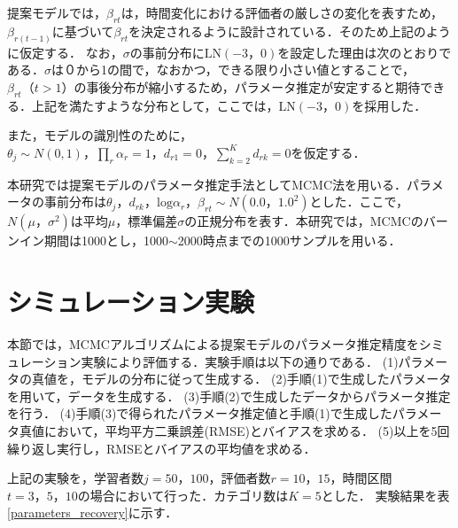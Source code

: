 \documentclass[dvipdfmx, twocolumn, a4paper]{hcresume}
\begin{document}
提案モデルでは，$\beta_{rt}$は，時間変化における評価者の厳しさの変化を表すため，$\beta_{r(t-1)}$に基づいて$\beta_{rt}$を決定されるように設計されている．そのため上記のように仮定する．
なお，$\sigma$の事前分布に$\mathrm{LN}(-3，0)$を設定した理由は次のとおりである．$\sigma$は０から1の間で，なおかつ，できる限り小さい値とすることで，$\beta_{rt}（t>1）$の事後分布が縮小するため，パラメータ推定が安定すると期待できる．上記を満たすような分布として，ここでは，$\mathrm{LN}(-3，0)$を採用した．

また，モデルの識別性のために，$\theta_{j}\sim N(0,1)，\prod_{r}\alpha_r=1，d_{r1}=0，\sum_{k=2}^{K}d_{rk}=0$を仮定する．

本研究では提案モデルのパラメータ推定手法としてMCMC法を用いる．パラメータの事前分布は$\theta_{j}，d_{rk}，\mathrm{log}\alpha_{r}，\beta_{rt}\sim N(0.0，1.0^{2})$とした．ここで，$N(\mu，\sigma^2)$は平均$\mu$，標準偏差$\sigma$の正規分布を表す．本研究では，MCMCのバーンイン期間は1000とし，1000$\sim$2000時点までの1000サンプルを用いる．
\section{シミュレーション実験}

本節では，MCMCアルゴリズムによる提案モデルのパラメータ推定精度をシミュレーション実験により評価する．実験手順は以下の通りである．
(1)パラメータの真値を，モデルの分布に従って生成する．
(2)手順(1)で生成したパラメータを用いて，データを生成する．
(3)手順(2)で生成したデータからパラメータ推定を行う．
(4)手順(3)で得られたパラメータ推定値と手順(1)で生成したパラメータ真値において，平均平方二乗誤差(RMSE)とバイアスを求める．
(5)以上を5回繰り返し実行し，RMSEとバイアスの平均値を求める．

上記の実験を，学習者数$j=50，100$，評価者数$r=10，15$，時間区間$t=3，5，10$の場合において行った．カテゴリ数は$K=5$とした．
実験結果を表\ref{parameters_recovery}に示す．
\end{document}
